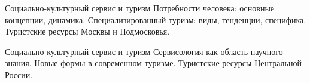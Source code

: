 \documentclass[
	11pt,
	a4paper,
	]
	{article}
\begin{document}
\begin{minipage}[t][\miniH]{\miniL}\centering
	 {Социально-культурный сервис и туризм}
		{
			Потребности человека: основные концепции, динамика.
		}{
			Специализированный туризм: виды, тенденции, специфика.
		}{
			Туристские ресурсы Москвы и Подмосковья.
		}
	\lowGE
\end{minipage}

\vfill



\begin{minipage}[t][\miniH]{\miniL}\centering
	 {Социально-культурный сервис и туризм}
		{
			Сервисология как область научного знания.
		}{
			Новые формы в современном туризме.
		}{
			Туристские ресурсы Центральной России.
		}
	\lowGE
\end{minipage}



	
\end{document}
